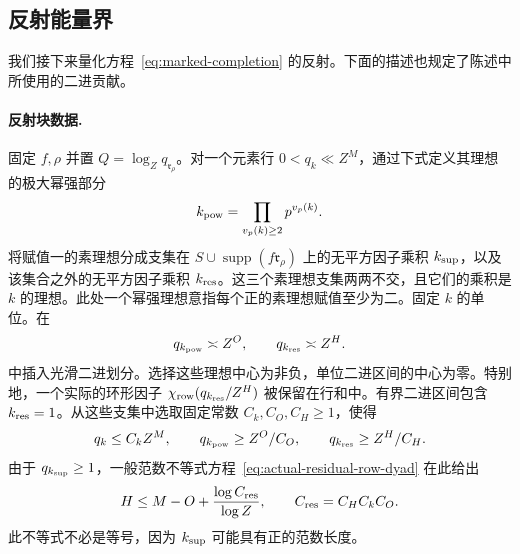 \documentclass[11pt,a4paper]{article}
\numberwithin{equation}{section}
\numberwithin{figure}{section}
\theoremstyle{definition}
\theoremstyle{remark}
\begin{document}
\subsection{反射能量界}

我们接下来量化方程~\eqref{eq:marked-completion} 的反射。下面的描述也规定了陈述中所使用的二进贡献。

\paragraph{反射块数据.}\label{par:reflected-energy-data}
固定 \(f,\rho\) 并置 \(Q=\log_Zq_{\mathfrak r_\rho}\)。对一个元素行 \(0<q_k\ll Z^M\)，通过下式定义其理想的极大幂强部分
\[
 k_{\rm pow}=\prod_{v_p(k)\ge2}p^{v_p(k)}.
\]
将赋值一的素理想分成支集在 \(S\cup\operatorname{supp}(f\mathfrak r_\rho)\) 上的无平方因子乘积 \(k_{\rm sup}\)，以及该集合之外的无平方因子乘积 \(k_{\rm res}\)。这三个素理想支集两两不交，且它们的乘积是 \(k\) 的理想。此处一个幂强理想意指每个正的素理想赋值至少为二。固定 \(k\) 的单位。在
\[
 q_{k_{\rm pow}}\asymp Z^O,\qquad q_{k_{\rm res}}\asymp Z^H.
\]
中插入光滑二进划分。选择这些理想中心为非负，单位二进区间的中心为零。特别地，一个实际的环形因子 \(\chi_{\rm row}(q_{k_{\rm res}}/Z^H)\) 被保留在行和中。有界二进区间包含 \(k_{\rm res}=1\)。从这些支集中选取固定常数 \(C_k,C_O,C_H\ge1\)，使得
\[
 q_k\le C_kZ^M,\qquad q_{k_{\rm pow}}\ge Z^O/C_O,\qquad
 q_{k_{\rm res}}\ge Z^H/C_H.
\]
由于 \(q_{k_{\rm sup}}\ge1\)，一般范数不等式方程~\eqref{eq:actual-residual-row-dyad} 在此给出
\[
 H\le M-O+\frac{\log C_{\rm res}}{\log Z},
 \qquad C_{\rm res}=C_HC_kC_O.
\]
此不等式不必是等号，因为 \(k_{\rm sup}\) 可能具有正的范数长度。
\end{document}
